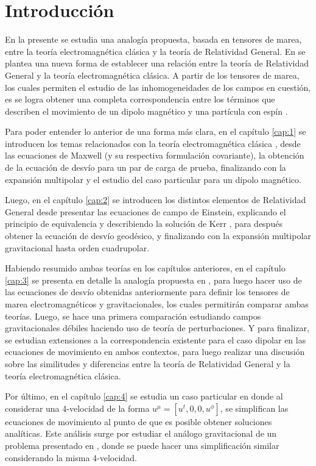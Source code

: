 \chapter*{Introducci\'on}

En la presente se estudia una analogía propuesta, basada en tensores de marea, entre la teoría electromagnética clásica y la teoría de Relatividad General. En \cite{Costa-Herdeiro} se plantea una nueva forma de establecer una relación entre la teoría de Relatividad General  y la teoría electromagnética clásica. A partir de los tensores de marea, los cuales permiten el estudio de las inhomogeneidades de los campos en cuestión, es se logra obtener una completa correspondencia entre los términos que describen el movimiento de un dipolo magnético y una partícula con espín \cite{Steinhoff-Puetzfeld}.

Para poder entender lo anterior de una forma más clara, en el capítulo \ref{cap:1} se introducen los temas relacionados con la teoría electromagnética clásica \cite{gr2}, desde las ecuaciones de Maxwell (y su respectiva formulación covariante), la obtención de la ecuación de desvío para un par de carga de prueba, finalizando con la expansión multipolar \cite{Dixon1,Dixon2,Dixon3} y el estudio del caso particular para un dipolo magnético.

Luego, en el capítulo \ref{cap:2} se introducen los distintos elementos de Relatividad General \cite{gr1,inverno,Steven,Hans,Poisson} desde presentar las ecuaciones de campo de Einstein, explicando el principio de equivalencia y describiendo la solución de Kerr \cite{Heinicke}, para después obtener la ecuación de desvío geodésico, y finalizando con la expansión multipolar gravitacional hasta orden cuadrupolar.

Habiendo resumido ambas teorías en los capítulos anteriores, en el capítulo \ref{cap:3} se presenta en detalle la analogía propuesta en \cite{Costa-Herdeiro}, para luego hacer uso de las ecuaciones de desvío obtenidas anteriormente para definir los tensores de marea electromagnéticos y gravitacionales, los cuales permitirán comparar ambas teorías. Luego, se hace una primera comparación estudiando campos gravitacionales débiles haciendo uso de teoría de perturbaciones. Y para finalizar, se estudian extensiones a la correspondencia existente para el caso dipolar en las ecuaciones de movimiento en ambos contextos, para luego realizar una discusión sobre las similitudes y diferencias entre la teoría de Relatividad General y la teoría electromagnética clásica.

Por último, en el capítulo \ref{cap:4} se estudia un caso particular en donde al considerar una 4-velocidad de la forma $u^{\mu}=\left[ u^t, 0, 0, u^{\phi} \right]$, se simplifican las ecuaciones de movimiento al punto de que es posible obtener soluciones analíticas. Este análisis surge por estudiar el análogo gravitacional de un problema presentado en \cite{Costa-Natario-Zilhao}, donde se puede hacer una simplificación similar considerando la misma 4-velocidad.